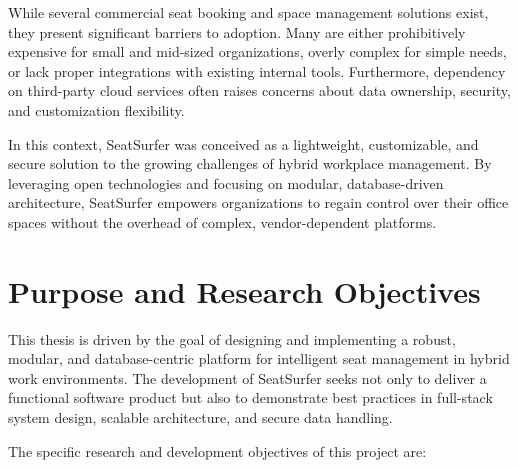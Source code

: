 \documentclass[12pt,a4paper]{report} %
\begin{document}
While several commercial seat booking and space management solutions exist, they present significant barriers to adoption. Many are either prohibitively expensive for small and mid-sized organizations, overly complex for simple needs, or lack proper integrations with existing internal tools. Furthermore, dependency on third-party cloud services often raises concerns about data ownership, security, and customization flexibility.

In this context, SeatSurfer was conceived as a lightweight, customizable, and secure solution to the growing challenges of hybrid workplace management. By leveraging open technologies and focusing on modular, database-driven architecture, SeatSurfer empowers organizations to regain control over their office spaces without the overhead of complex, vendor-dependent platforms.

\section*{Purpose and Research Objectives}

This thesis is driven by the goal of designing and implementing a robust, modular, and database-centric platform for intelligent seat management in hybrid work environments. The development of SeatSurfer seeks not only to deliver a functional software product but also to demonstrate best practices in full-stack system design, scalable architecture, and secure data handling.

The specific research and development objectives of this project are:
\end{document}
